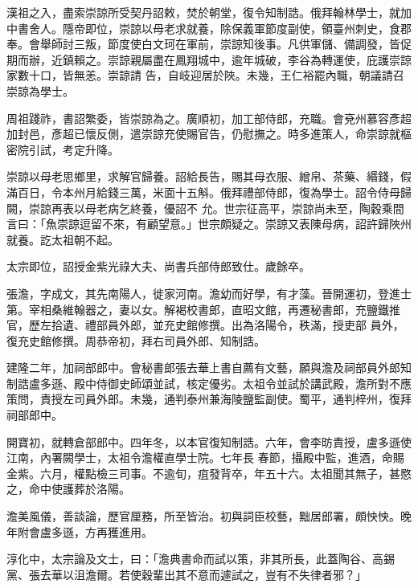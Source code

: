 \begin{pinyinscope}
 漢祖之入，盡索崇諒所受契丹詔敕，焚於朝堂，復令知制誥。俄拜翰林學士，就加中書舍人。隱帝即位，崇諒以母老求就養，除保義軍節度副使，領臺州刺史，食郡奉。會舉師討三叛，節度使白文珂在軍前，崇諒知後事。凡供軍儲、備調發，皆促期而辦，近鎮賴之。崇諒親屬盡在鳳翔城中，逾年城破，李谷為轉運使，庇護崇諒家數十口，皆無恙。崇諒請
 告，自岐迎居於陜。未幾，王仁裕罷內職，朝議請召崇諒為學士。



 周祖踐祚，書詔繁委，皆崇諒為之。廣順初，加工部侍郎，充職。會兗州慕容彥超加封邑，彥超已懷反側，遣崇諒充使賜官告，仍慰撫之。時多進策人，命崇諒就樞密院引試，考定升降。



 崇諒以母老思鄉里，求解官歸養。詔給長告，賜其母衣服、繒帛、茶藥、緡錢，假滿百日，令本州月給錢三萬，米面十五斛。俄拜禮部侍郎，復為學士。詔令侍母歸闕，崇諒再表以母老病乞終養，優詔不
 允。世宗征高平，崇諒尚未至，陶穀乘間言曰：「魚崇諒逗留不來，有顧望意。」世宗頗疑之。崇諒又表陳母病，詔許歸陜州就養。訖太祖朝不起。



 太宗即位，詔授金紫光祿大夫、尚書兵部侍郎致仕。歲餘卒。



 張澹，字成文，其先南陽人，徙家河南。澹幼而好學，有才藻。晉開運初，登進士第。宰相桑維翰器之，妻以女。解褐校書郎，直昭文館，再遷秘書郎，充鹽鐵推官，歷左拾遺、禮部員外郎，並充史館修撰。出為洛陽令，秩滿，授吏部
 員外，復充史館修撰。周恭帝初，拜右司員外郎、知制誥。



 建隆二年，加祠部郎中。會秘書郎張去華上書自薦有文藝，願與澹及祠部員外郎知制誥盧多遜、殿中侍御史師頌並試，核定優劣。太祖令並試於講武殿，澹所對不應策問，責授左司員外郎。未幾，通判泰州兼海陵鹽監副使。蜀平，通判梓州，復拜祠部郎中。



 開寶初，就轉倉部郎中。四年冬，以本官復知制誥。六年，會李昉責授，盧多遜使江南，內署闕學士，太祖令澹權直學士院。七年長
 春節，攝殿中監，進酒，命賜金紫。六月，權點檢三司事。不逾旬，疽發背卒，年五十六。太祖聞其無子，甚愍之，命中使護葬於洛陽。



 澹美風儀，善談論，歷官厘務，所至皆治。初與詞臣校藝，黜居郎署，頗怏怏。晚年附會盧多遜，方再獲進用。



 淳化中，太宗論及文士，曰：「澹典書命而試以策，非其所長，此蓋陶谷、高錫黨、張去華以沮澹爾。若使穀輩出其不意而遽試之，豈有不失律者邪？」




\end{pinyinscope}
